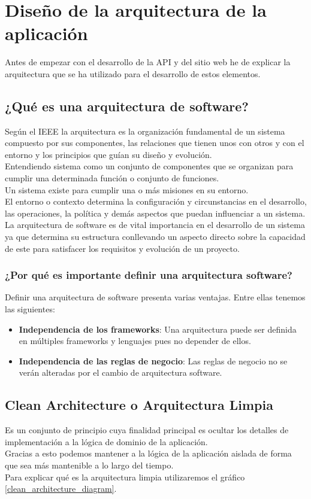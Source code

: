 \section{Diseño de la arquitectura de la aplicación}
Antes de empezar con el desarrollo de la API y del sitio web he de explicar la arquitectura que se ha utilizado para el desarrollo de estos elementos.

\subsection{¿Qué es una arquitectura de software?}
Según el IEEE la arquitectura es la organización fundamental de un sistema compuesto por sus componentes, las relaciones que tienen unos con otros y con el entorno y los principios que guían su diseño y evolución.
\\Entendiendo sistema como un conjunto de componentes que se organizan para cumplir una determinada función o conjunto de funciones.
\\Un sistema existe para cumplir una o más misiones en su entorno.
\\El entorno o contexto determina la configuración y circunstancias en el desarrollo, las operaciones, la política y demás aspectos que puedan influenciar a un sistema.
\\La arquitectura de software es de vital importancia en el desarrollo de un sistema ya que determina su estructura conllevando un aspecto directo sobre la capacidad de este para satisfacer los requisitos y evolución de un proyecto.

\subsubsection{¿Por qué es importante definir una arquitectura software?}
Definir una arquitectura de software presenta varias ventajas. Entre ellas tenemos las siguientes:
\begin{itemize}
    \item \textbf{Independencia de los frameworks}: Una arquitectura puede ser definida en múltiples frameworks y lenguajes pues no depender de ellos.
    \item \textbf{Independencia de las reglas de negocio}: Las reglas de negocio no se verán alteradas por el cambio de arquitectura software.
\end{itemize}


\subsection{Clean Architecture o Arquitectura Limpia}
Es un conjunto de principio cuya finalidad principal es ocultar los detalles de implementación a la lógica de dominio de la aplicación.
\\Gracias a esto podemos mantener a la lógica de la aplicación aislada de forma que sea más mantenible a lo largo del tiempo.
\\Para explicar qué es la arquitectura limpia utilizaremos el gráfico \ref{clean_architecture_diagram}.

